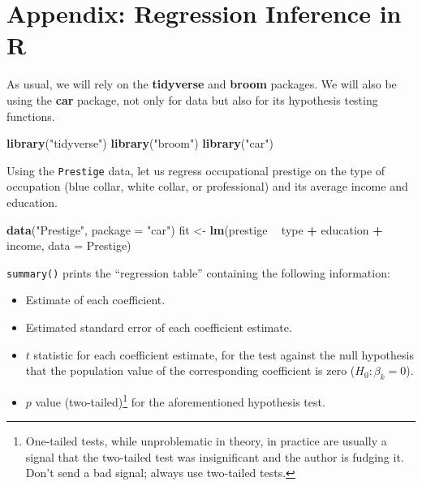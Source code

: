\documentclass[12pt,oneside,openany]{book}
\newenvironment{Shaded}{\begin{snugshade}}{\end{snugshade}}
\newcommand{\KeywordTok}[1]{\textcolor[rgb]{0.13,0.29,0.53}{\textbf{#1}}}
\newcommand{\DataTypeTok}[1]{\textcolor[rgb]{0.13,0.29,0.53}{#1}}
\newcommand{\StringTok}[1]{\textcolor[rgb]{0.31,0.60,0.02}{#1}}
\newcommand{\OperatorTok}[1]{\textcolor[rgb]{0.81,0.36,0.00}{\textbf{#1}}}
\newcommand{\NormalTok}[1]{#1}
\providecommand{\tightlist}{%
  \setlength{\itemsep}{0pt}\setlength{\parskip}{0pt}}
\let\rmarkdownfootnote\footnote%
\def\footnote{\protect\rmarkdownfootnote}
\begin{document}
\section{Appendix: Regression Inference in
R}\label{appendix-regression-inference-in-r}

As usual, we will rely on the \textbf{tidyverse} and \textbf{broom}
packages. We will also be using the \textbf{car} package, not only for
data but also for its hypothesis testing functions.

\begin{Shaded}
\begin{Highlighting}[]
\KeywordTok{library}\NormalTok{(}\StringTok{"tidyverse"}\NormalTok{)}
\KeywordTok{library}\NormalTok{(}\StringTok{"broom"}\NormalTok{)}
\KeywordTok{library}\NormalTok{(}\StringTok{"car"}\NormalTok{)}
\end{Highlighting}
\end{Shaded}

Using the \texttt{Prestige} data, let us regress occupational prestige
on the type of occupation (blue collar, white collar, or professional)
and its average income and education.

\begin{Shaded}
\begin{Highlighting}[]
\KeywordTok{data}\NormalTok{(}\StringTok{"Prestige"}\NormalTok{, }\DataTypeTok{package =} \StringTok{"car"}\NormalTok{)}
\NormalTok{fit <-}\StringTok{ }\KeywordTok{lm}\NormalTok{(prestige }\OperatorTok{~}\StringTok{ }\NormalTok{type }\OperatorTok{+}\StringTok{ }\NormalTok{education }\OperatorTok{+}\StringTok{ }\NormalTok{income, }\DataTypeTok{data =}\NormalTok{ Prestige)}
\end{Highlighting}
\end{Shaded}

\texttt{summary()} prints the ``regression table'' containing the
following information:

\begin{itemize}
\tightlist
\item
  Estimate of each coefficient.
\item
  Estimated standard error of each coefficient estimate.
\item
  \(t\) statistic for each coefficient estimate, for the test against
  the null hypothesis that the population value of the corresponding
  coefficient is zero (\(H_0 : \beta_k = 0\)).
\item
  \(p\) value (two-tailed)\footnote{One-tailed tests, while
    unproblematic in theory, in practice are usually a signal that the
    two-tailed test was insignificant and the author is fudging it.
    Don't send a bad signal; always use two-tailed tests.} for the
  aforementioned hypothesis test.
\end{itemize}
\end{document}
